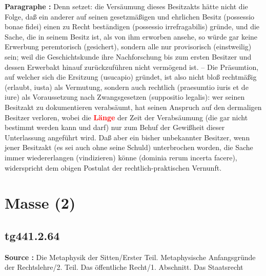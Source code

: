 \documentclass[a4paper,12pt,twoside]{book}
\newcommand{\match}[1]{\textcolor{red}{\textbf{#1}}}
\newcommand{\unnumberedsection}[1]{
	\section*{#1}
	\addcontentsline{toc}{section}{#1}
	\markright{#1}
}
\begin{document}
	\textbf{Paragraphe : }Denn setzet: die Versäumung dieses Besitzakts hätte nicht die Folge, daß ein anderer auf seinen gesetzmäßigen und ehrlichen Besitz (possessio bonae fidei) einen zu Recht beständigen (possessio irrefragabilis) gründe, und die Sache, die in seinem Besitz ist, als von ihm erworben ansehe, so würde gar keine Erwerbung peremtorisch (gesichert), sondern alle nur provisorisch (einstweilig) sein; weil die Geschichtskunde ihre Nachforschung bis zum ersten Besitzer und dessen Erwerbakt hinauf zurückzuführen nicht vermögend  ist. – Die Präsumtion, auf welcher sich die Ersitzung (usucapio) gründet, ist also nicht bloß rechtmäßig (erlaubt, iusta) als Vermutung, sondern auch rechtlich (praesumtio iuris et de iure) als Voraussetzung nach Zwangsgesetzen (suppositio legalis): wer seinen Besitzakt zu dokumentieren verabsäumt, hat seinen Anspruch auf den dermaligen Besitzer verloren, wobei die \match{Länge} der Zeit der Verabsäumung (die gar nicht bestimmt werden kann und darf) nur zum Behuf der Gewißheit dieser Unterlassung angeführt wird. Daß aber ein bisher unbekannter Besitzer, wenn jener Besitzakt (es sei auch ohne seine Schuld) unterbrochen worden, die Sache immer wiedererlangen (vindizieren) könne (dominia rerum incerta facere), widerspricht dem obigen Postulat der rechtlich-praktischen Vernunft. 
	
	\unnumberedsection{Masse (2)} 
	\subsection*{tg441.2.64} 
	\textbf{Source : }Die Metaphysik der Sitten/Erster Teil. Metaphysische Anfangsgründe der Rechtslehre/2. Teil. Das öffentliche Recht/1. Abschnitt. Das Staatsrecht\\  
	
\end{document}
